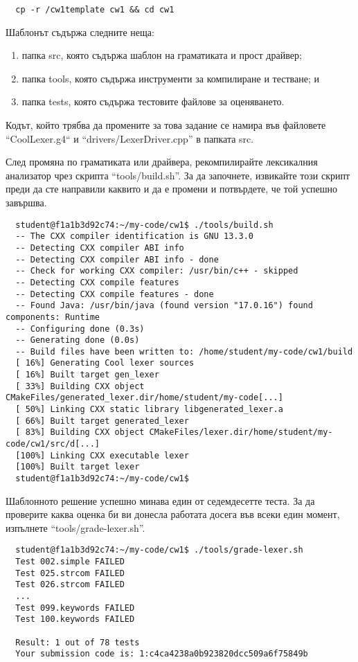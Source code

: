 \documentclass[11pt]{article}
\begin{document}
\begin{verbatim}
  cp -r /cw1template cw1 && cd cw1
\end{verbatim}

\noindent Шаблонът съдържа следните неща:

\begin{enumerate}
    \item папка src, която съдържа шаблон на граматиката и прост драйвер;
    \item папка tools, която съдържа инструменти за компилиране и тестване; и
    \item папка tests, която съдържа тестовите файлове за оценяването.
\end{enumerate}

\noindent Кодът, който трябва да промените за това задание се намира във файловете ``CoolLexer.g4`` и ``drivers/LexerDriver.cpp'' в папката src.

След промяна по граматиката или драйвера, рекомпилирайте лексикалния анализатор чрез скрипта ``tools/build.sh''.
За да започнете, извикайте този скрипт преди да сте направили каквито и да е промени и потвърдете, че той успешно завършва.

\begin{verbatim}
  student@f1a1b3d92c74:~/my-code/cw1$ ./tools/build.sh
  -- The CXX compiler identification is GNU 13.3.0
  -- Detecting CXX compiler ABI info
  -- Detecting CXX compiler ABI info - done
  -- Check for working CXX compiler: /usr/bin/c++ - skipped
  -- Detecting CXX compile features
  -- Detecting CXX compile features - done
  -- Found Java: /usr/bin/java (found version "17.0.16") found components: Runtime
  -- Configuring done (0.3s)
  -- Generating done (0.0s)
  -- Build files have been written to: /home/student/my-code/cw1/build
  [ 16%] Generating Cool lexer sources
  [ 16%] Built target gen_lexer
  [ 33%] Building CXX object CMakeFiles/generated_lexer.dir/home/student/my-code[...]
  [ 50%] Linking CXX static library libgenerated_lexer.a
  [ 66%] Built target generated_lexer
  [ 83%] Building CXX object CMakeFiles/lexer.dir/home/student/my-code/cw1/src/d[...]
  [100%] Linking CXX executable lexer
  [100%] Built target lexer
  student@f1a1b3d92c74:~/my-code/cw1$
\end{verbatim}

Шаблонното решение успешно минава един от седемдесетте теста.
За да проверите каква оценка би ви донесла работата досега във всеки един момент, изпълнете ``tools/grade-lexer.sh''.

\begin{verbatim}
  student@f1a1b3d92c74:~/my-code/cw1$ ./tools/grade-lexer.sh
  Test 002.simple FAILED
  Test 025.strcom FAILED
  Test 026.strcom FAILED
  ...
  Test 099.keywords FAILED
  Test 100.keywords FAILED
  
  Result: 1 out of 78 tests
  Your submission code is: 1:c4ca4238a0b923820dcc509a6f75849b
\end{verbatim}
\end{document}
